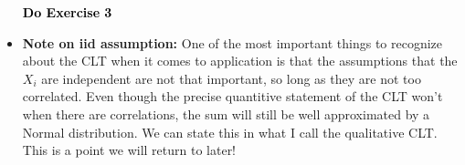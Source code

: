 \begin{itemize}



\vspace{1cm}
\begin{center}
\textcolor{black}{{\bf \Huge Do Exercise 3}}
\end{center}
\vspace{1cm}

\item {\bf Note on iid assumption:} One of the most important things to recognize about the CLT when it comes to application is that the assumptions that the $X_i$ are independent are not that important, so long as they are not too correlated. Even though the precise quantitive statement of the CLT won't when there are correlations, the sum will still be well approximated by a Normal distribution. We can state this in what I call the qualitative CLT. This is a point we will return to later! 

\end{itemize} 


